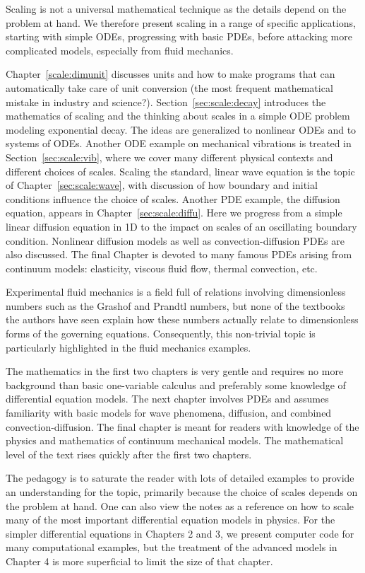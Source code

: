 \documentclass[graybox,envcountchap,sectrefs,final]{svmonodo}
\begin{document}
Scaling is not a universal mathematical technique as the details
depend on the problem at hand. We therefore present scaling in a range
of specific applications, starting with simple ODEs, progressing with
basic PDEs, before attacking more complicated models, especially from
fluid mechanics.

Chapter~\ref{scale:dimunit} discusses units and how to make programs
that can automatically take care of unit conversion (the most frequent
mathematical mistake in industry and science?).  Section~\ref{sec:scale:decay} introduces the mathematics of scaling and the
thinking about scales in a simple ODE problem modeling exponential
decay. The ideas are generalized to nonlinear ODEs and to systems of
ODEs.  Another ODE example on mechanical vibrations is treated in
Section~\ref{sec:scale:vib}, where we cover many different physical
contexts and different choices of scales.  Scaling the standard,
linear wave equation is the topic of Chapter~\ref{sec:scale:wave}, with
discussion of how boundary and initial conditions influence the choice
of scales.  Another PDE example, the diffusion equation, appears in
Chapter~\ref{sec:scale:diffu}. Here we progress from a simple linear
diffusion equation in 1D to the impact on scales of an oscillating
boundary condition. Nonlinear diffusion models as well as
convection-diffusion PDEs are also discussed.  The final Chapter is
devoted to many famous PDEs arising from continuum models: elasticity,
viscous fluid flow, thermal convection, etc.

Experimental fluid mechanics is a field full of relations involving
dimensionless numbers such as the Grashof and Prandtl
numbers, but none of the textbooks the authors have seen explain how
these numbers actually relate to dimensionless forms of the governing
equations. Consequently, this non-trivial topic is particularly
highlighted in the fluid mechanics examples.

The mathematics in the first two chapters is very gentle and requires
no more background than basic one-variable calculus and preferably
some knowledge of differential equation models. The next chapter
involves PDEs and assumes familiarity with basic models for wave
phenomena, diffusion, and combined convection-diffusion. The final
chapter is meant for readers with knowledge of the physics and
mathematics of continuum mechanical models. The mathematical level of
the text rises quickly after the first two chapters.

The pedagogy is to saturate the reader with lots of detailed examples to
provide an understanding for the topic, primarily because the choice
of scales depends on the problem at hand. One can also view the notes
as a reference on how to scale many of the most important differential
equation models in physics.  For the simpler differential equations in
Chapters 2 and 3, we present computer code for many computational
examples, but the treatment of the advanced models in Chapter 4 is
more superficial to limit the size of that chapter.
\end{document}
